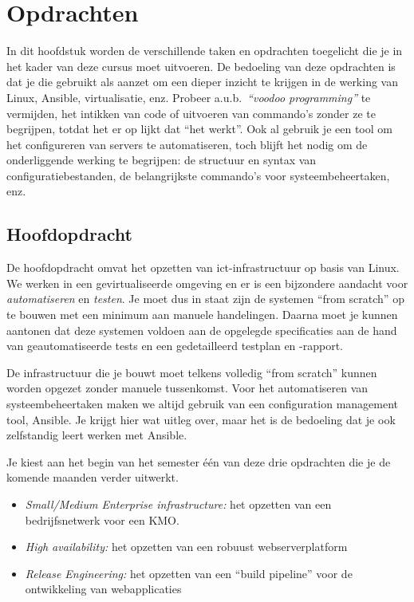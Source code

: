 \chapter{Opdrachten}
\label{ch:opdrachten}

In dit hoofdstuk worden de verschillende taken en opdrachten toegelicht die je in het kader van deze cursus moet uitvoeren. De bedoeling van deze opdrachten is dat je die gebruikt als aanzet om een dieper inzicht te krijgen in de werking van Linux, Ansible, virtualisatie, enz. Probeer a.u.b.~\emph{``voodoo programming''} te vermijden, het intikken van code of uitvoeren van commando's zonder ze te begrijpen, totdat het er op lijkt dat ``het werkt''. Ook al gebruik je een tool om het configureren van servers te automatiseren, toch blijft het nodig om de onderliggende werking te begrijpen: de structuur en syntax van configuratiebestanden, de belangrijkste commando's voor systeembeheertaken, enz.

\section{Hoofdopdracht}
\label{sec:hoofdopdracht}

De hoofdopdracht omvat het opzetten van ict-infrastructuur op basis van Linux. We werken in een gevirtualiseerde omgeving en er is een bijzondere aandacht voor \emph{automatiseren} en \emph{testen}. Je moet dus in staat zijn de systemen ``from scratch'' op te bouwen met een minimum aan manuele handelingen. Daarna moet je kunnen aantonen dat deze systemen voldoen aan de opgelegde specificaties aan de hand van geautomatiseerde tests en een gedetailleerd testplan en -rapport.

De infrastructuur die je bouwt moet telkens volledig ``from scratch'' kunnen worden opgezet zonder manuele tussenkomst. Voor het automatiseren van systeembeheertaken maken we altijd gebruik van een configuration management tool, Ansible. Je krijgt hier wat uitleg over, maar het is de bedoeling dat je ook zelfstandig leert werken met Ansible.

Je kiest aan het begin van het semester één van deze drie opdrachten die je de komende maanden verder uitwerkt.

\begin{itemize}
\item \emph{Small/Medium Enterprise infrastructure:} het opzetten van een bedrijfsnetwerk voor een KMO.
\item \emph{High availability:} het opzetten van een robuust webserverplatform
\item \emph{Release Engineering:} het opzetten van een ``build pipeline'' voor de ontwikkeling van webapplicaties
\end{itemize}


